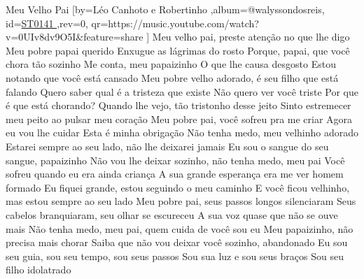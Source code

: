 \beginsong
{Meu Velho Pai %
}[by={Léo Canhoto e Robertinho %
},album={@walyssondosreis},
id={\href{https://music.youtube.com/watch?v=0UIv8dv9O5I&feature=share %
}{ST0141 %
}},rev={0}, %
qr={https://music.youtube.com/watch?v=0UIv8dv9O5I&feature=share %
}]
\tom{}{}
\beginverse
Meu velho pai, preste atenção no que lhe digo
Meu pobre papai querido
Enxugue as lágrimas do rosto
Porque, papai, que você chora tão sozinho
Me conta, meu papaizinho
O que lhe causa desgosto
\endverse
\beginverse
Estou notando que você está cansado
Meu pobre velho adorado, é seu filho que está falando
Quero saber qual é a tristeza que existe
Não quero ver você triste
Por que é que está chorando?
\endverse
\beginverse
Quando lhe vejo, tão tristonho desse jeito
Sinto estremecer meu peito ao pulsar meu coração
Meu pobre pai, você sofreu pra me criar
Agora eu vou lhe cuidar
Esta é minha obrigação
\endverse
\beginverse
Não tenha medo, meu velhinho adorado
Estarei sempre ao seu lado, não lhe deixarei jamais
Eu sou o sangue do seu sangue, papaizinho
Não vou lhe deixar sozinho, não tenha medo, meu pai
\endverse
\beginverse
Você sofreu quando eu era ainda criança
A sua grande esperança era me ver homem formado
Eu fiquei grande, estou seguindo o meu caminho
E você ficou velhinho, mas estou sempre ao seu lado
\endverse
\beginverse
Meu pobre pai, seus passos longos silenciaram
Seus cabelos branquiaram, seu olhar se escureceu
A sua voz quase que não se ouve mais
Não tenha medo, meu pai, quem cuida de você sou eu
\endverse
\beginchorus
Meu papaizinho, não precisa mais chorar
Saiba que não vou deixar você sozinho, abandonado
Eu sou seu guia, sou seu tempo, sou seus passos
Sou sua luz e sou seus braços
Sou seu filho idolatrado
\endchorus

